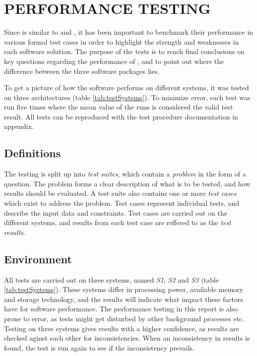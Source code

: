 
\chapter{PERFORMANCE TESTING}

Since \snowman{} is similar to \bhtb{} and \snortmanager{}, it has been
important to benchmark their performance in various formal test cases in order to
highlight the strength and weaknesses in each software solution. The
purpose of the tests is to reach final conclusions on key questions regarding
the performance of \snowman{}, and to point out where the difference between the
three software packages lies.

To get a picture of how the software performs on different systems, it was
tested on three architectures (table \ref{tab:testSystems}). To minimize error, each test
was run five times where the mean value of the runs is considered the valid test
result. All tests can be reproduced with the test procedure documentation in
appendix. %

\section{Definitions}

The testing is split up into \textit{test suites}, which contain a
\textit{problem} in the form of a question. The problem forms a clear
description of what is to be tested, and how results should be evaluated.
A test suite also contains one or more \textit{test cases} which exist to
address the problem. Test cases represent individual tests, and describe the input data
and constraints. Test cases are carried out on the different systems, and
results from each test case are reffered to as the \textit{test results}.

\section{Environment}
All tests are carried out on three systems, named \textit{S1}, \textit{S2} and
\textit{S3} (table \ref{tab:testSystems}). These systems differ in processing
power, available memory and storage technology, and the results will indicate
what impact these factors have for software performance. The performance
testing in this report is also prone to error, as tests might get disturbed by
other background processes etc. Testing on three systems gives results with a
higher confidence, as results are checked aginst each other for 
inconsistencies. When an inconsistency in results is found, the test is run
again to see if the inconsistency prevails.

